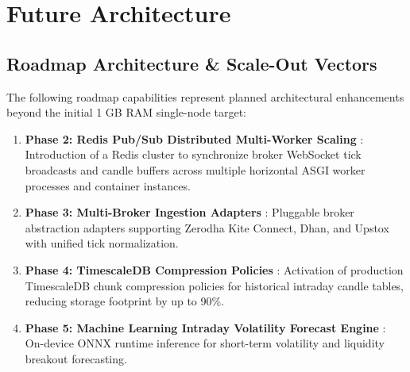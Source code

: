 \chapter{Future Architecture}
\label{ch:future_architecture}

\section{Roadmap Architecture \& Scale-Out Vectors}
The following roadmap capabilities represent planned architectural enhancements beyond the initial 1 GB RAM single-node target:

\begin{enumerate}[leftmargin=6mm,itemsep=2mm]
    \item \textbf{Phase 2: Redis Pub/Sub Distributed Multi-Worker Scaling} :
    Introduction of a Redis cluster to synchronize broker WebSocket tick broadcasts and candle buffers across multiple horizontal ASGI worker processes and container instances.
    \item \textbf{Phase 3: Multi-Broker Ingestion Adapters} :
    Pluggable broker abstraction adapters supporting Zerodha Kite Connect, Dhan, and Upstox with unified tick normalization.
    \item \textbf{Phase 4: TimescaleDB Compression Policies} :
    Activation of production TimescaleDB chunk compression policies for historical intraday candle tables, reducing storage footprint by up to 90\%.
    \item \textbf{Phase 5: Machine Learning Intraday Volatility Forecast Engine} :
    On-device ONNX runtime inference for short-term volatility and liquidity breakout forecasting.
\end{enumerate}
